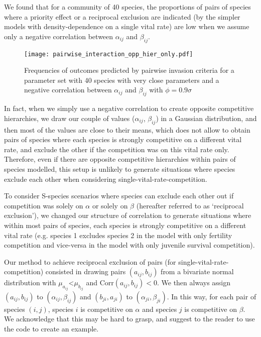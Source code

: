 \documentclass{article}
\begin{document}
We found that for a community of 40 species, the proportions of pairs of species where a priority effect or a reciprocal exclusion are indicated (by the simpler models with density-dependence on a single vital rate) are low when we assume only a negative correlation between $\alpha_{ij}$ and $\beta_{ij}$. 
\begin{figure}[H]
    \centering
    \texttt{[image: pairwise\_interaction\_opp\_hier\_only.pdf]}
    \caption{Frequencies of outcomes predicted by pairwise invasion criteria for a parameter set with 40 species with very close parameters and a negative correlation between $\alpha_{ij}$ and $\beta_{ij}$ with $\phi = 0.9\sigma$ }
    \label{fig:pairwise_interaction_opp_hier_only}
\end{figure}
In fact, when we simply use a negative correlation to create opposite competitive hierarchies, we draw our couple of values ($\alpha_{ij}$, $\beta_{ij}$) in a Gaussian distribution, and then most of the values are close to their means, which does not allow to obtain pairs of species where each species is strongly competitive on a different vital rate, and exclude the other if the competition was on this vital rate only. Therefore, even if there are opposite competitive hierarchies within pairs of species modelled, this setup is unlikely to generate situations where species exclude each other when considering single-vital-rate-competition. 

To consider S-species scenarios where species can exclude each other out if competition was solely on $\alpha$ or solely on $\beta$ (hereafter referred to as `reciprocal exclusion'), we changed our structure of correlation to generate situations where within most pairs of species, each species is strongly competitive on a different vital rate (e.g. species 1 excludes species 2 in the model with only fertility competition and vice-versa in the model with only juvenile survival competition). 

Our method to achieve reciprocal exclusion of pairs (for single-vital-rate-competition) consisted in drawing pairs $(a_{ij},b_{ij})$ from a bivariate normal distribution with $\mu_{a_{ij}}$<$\mu_{b_{ij}}$ and $\text{Corr}(a_{ij},b_{ij}) < 0$. We then always assign $(a_{ij},b_{ij})$ to $(\alpha_{ij}, \beta_{ij})$ and $(b_{ji},a_{ji})$ to $(\alpha_{ji}, \beta_{ji})$. In this way, for each pair of species $(i,j)$, species $i$ is competitive on $\alpha$ and species $j$ is competitive on $\beta$. We acknowledge that this may be hard to grasp, and suggest to the reader to use the code to create an example. 
\end{document}
